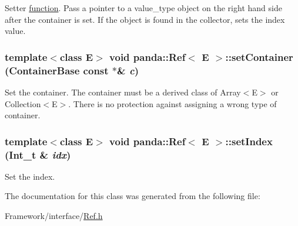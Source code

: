 Setter \hyperlink{namespacepanda_1_1function}{function}. Pass a pointer to a value\_\-type object on the right hand side after the container is set. If the object is found in the collector, sets the index value. \hypertarget{classpanda_1_1Ref_a8e17556e348a48fe243aee93f714ba80}{
\subsubsection[{setContainer}]{\setlength{\rightskip}{0pt plus 5cm}template$<$class E$>$ void {\bf panda::Ref}$<$ E $>$::setContainer ({\bf ContainerBase} const $\ast$\& {\em c})}}
\label{classpanda_1_1Ref_a8e17556e348a48fe243aee93f714ba80}


Set the container. The container must be a derived class of Array$<$E$>$ or Collection$<$E$>$. There is no protection against assigning a wrong type of container. \hypertarget{classpanda_1_1Ref_ad310725ff2b08e1f83e40fa21599894a}{
\subsubsection[{setIndex}]{\setlength{\rightskip}{0pt plus 5cm}template$<$class E$>$ void {\bf panda::Ref}$<$ E $>$::setIndex (Int\_\-t \& {\em idx})}}
\label{classpanda_1_1Ref_ad310725ff2b08e1f83e40fa21599894a}


Set the index. 

The documentation for this class was generated from the following file:\begin{DoxyCompactItemize}
\item 
Framework/interface/\hyperlink{Ref_8h}{Ref.h}\end{DoxyCompactItemize}
